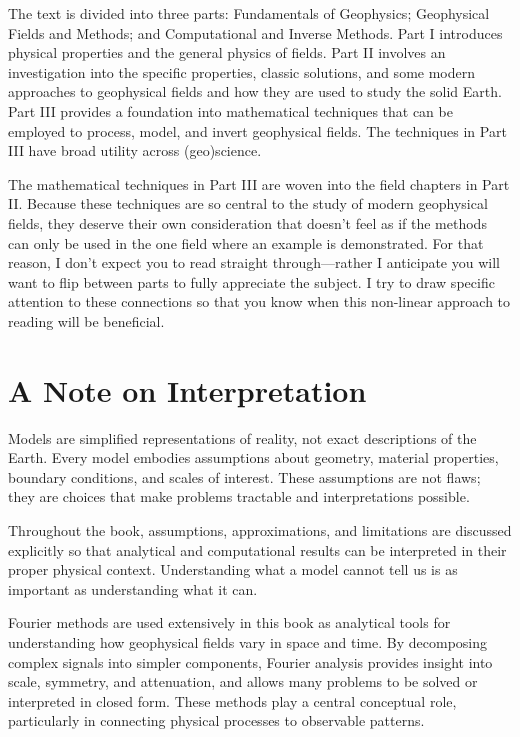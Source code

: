 The text is divided into three parts: Fundamentals of Geophysics; Geophysical Fields and Methods; and Computational and Inverse Methods.  Part I introduces physical properties and the general physics of fields.  Part II involves an investigation into the specific properties, classic solutions, and some modern approaches to geophysical fields and how they are used to study the solid Earth.  Part III provides a foundation into mathematical techniques that can be employed to process, model, and invert geophysical fields.  The techniques in Part III have broad utility across (geo)science.  

The mathematical techniques in Part III are woven into the field chapters in Part II.  Because these techniques are so central to the study of modern geophysical fields, they deserve their own consideration that doesn't feel as if the methods can only be used in the one field where an example is demonstrated.  For that reason, I don't expect you to read straight through---rather I anticipate you will want to flip between parts to fully appreciate the subject.  I try to draw specific attention to these connections so that you know when this non-linear approach to reading will be beneficial.

\section*{A Note on Interpretation}

Models are simplified representations of reality, not exact descriptions of the Earth. Every model embodies assumptions about geometry, material properties, boundary conditions, and scales of interest. These assumptions are not flaws; they are choices that make problems tractable and interpretations possible.

Throughout the book, assumptions, approximations, and limitations are discussed explicitly so that analytical and computational results can be interpreted in their proper physical context. Understanding what a model cannot tell us is as important as understanding what it can.

Fourier methods are used extensively in this book as analytical tools for understanding how geophysical fields vary in space and time. By decomposing complex signals into simpler components, Fourier analysis provides insight into scale, symmetry, and attenuation, and allows many problems to be solved or interpreted in closed form. These methods play a central conceptual role, particularly in connecting physical processes to observable patterns.

